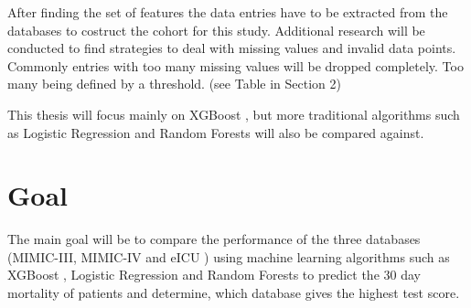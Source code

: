 \documentclass[
	a4paper,
	pagesize,
	pdftex,
	12pt,
	ngerman,
	fleqn,
	final,
	]{scrartcl}
\begin{document}
		After finding the set of features the data entries have to be extracted from the databases to costruct the cohort for this study. 
		Additional research will be conducted to find strategies to deal with missing values and invalid data points.
		Commonly entries with too many missing values will be dropped completely. Too many being defined by a threshold. (see Table in Section 2)

		This thesis will focus mainly on XGBoost \cite{xgb}, but more traditional algorithms such as Logistic Regression \cite{logistic} and Random Forests \cite{randomforest} will also be compared against.

	\section{Goal}

		The main goal will be to compare the performance of the three databases (MIMIC-III, MIMIC-IV \cite{physio} and eICU \cite{eicu}) using machine learning
		algorithms such as XGBoost \cite{xgb}, Logistic Regression \cite{logistic} and Random Forests \cite{randomforest} to predict the 30 day mortality of patients and determine, which database gives the highest test score.
\end{document}
